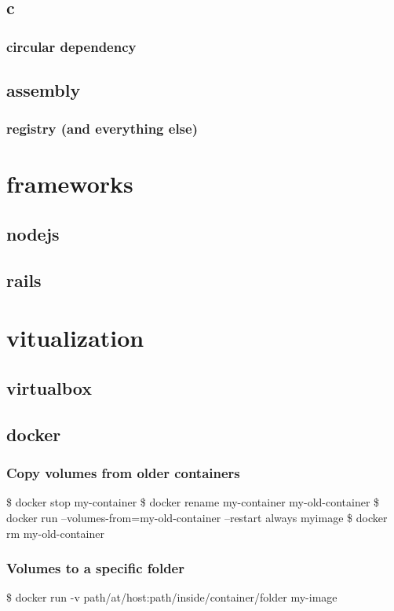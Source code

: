 \documentclass{report}
\begin{document}
\section{c}
\subsection{circular dependency}

\section{assembly}
\subsection{registry (and everything else)}


\chapter{frameworks}
\section{nodejs}
\section{rails}

\chapter{vitualization}
\section{virtualbox}
\section{docker}
\subsection{Copy volumes from older containers}
\begin{displayquote}
\$ docker stop my-container \newline
\$ docker rename my-container my-old-container \newline
\$ docker run --volumes-from=my-old-container --restart always myimage \newline
\$ docker rm my-old-container
\end{displayquote}
\subsection{Volumes to a specific folder}
\begin{displayquote}
\$ docker run -v path/at/host:path/inside/container/folder my-image \newline
\end{displayquote}
\end{document}
